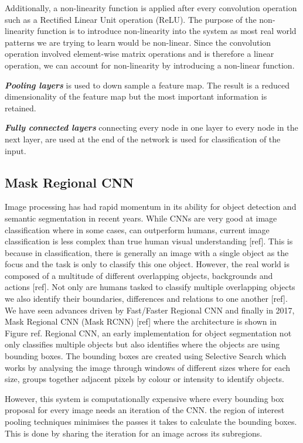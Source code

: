 Additionally, a non-linearity function is applied after every convolution operation such as a Rectified Linear Unit operation (ReLU). The purpose of the non-linearity function is to introduce non-linearity into the system as most real world patterns we are trying to learn would be non-linear. Since the convolution operation involved element-wise matrix operations and is therefore a linear operation, we can account for non-linearity by introducing a non-linear function.

\textbf{\textit{Pooling layers}} is used to down sample a feature map. The result is a reduced dimensionality of the feature map but the most important information is retained. 

\textbf{\textit{Fully connected layers}} connecting every node in one layer to every node in the next layer, are used at the end of the network is used for classification of the input.

\subsection{Mask Regional CNN}
Image processing has had rapid momentum in its ability for object detection and semantic segmentation in recent years. While CNNs are very good at image classification where in some cases, can outperform humans, current image classification is less complex than true human visual understanding [ref]. This is because in classification, there is generally an image with a single object as the focus and the task is only to classify this one object. However, the real world is composed of a multitude of different overlapping objects, backgrounds and actions [ref]. Not only are humans tasked to classify multiple overlapping objects we also identify their boundaries, differences and relations to one another [ref]. 
We have seen advances driven by Fast/Faster Regional CNN and finally in 2017, Mask Regional CNN (Mask RCNN) [ref] where the architecture is shown in Figure ref. Regional CNN, an early implementation for object segmentation not only classifies multiple objects but also identifies where the objects are using bounding boxes. The bounding boxes are created using Selective Search which works by analysing the image through windows of different sizes where for each size, groups together adjacent pixels by colour or intensity to identify objects. 

However, this system is computationally expensive  where every bounding box proposal for every image needs an iteration of the CNN. the region of interest pooling techniques minimises the passes it takes to calculate the bounding boxes. This is done by sharing the iteration for an image across its subregions.  

